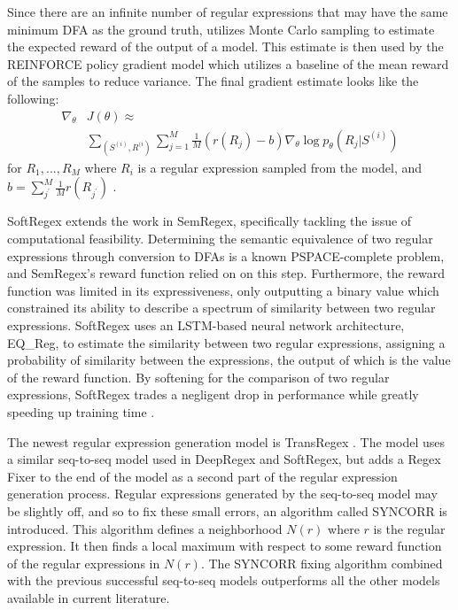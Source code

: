 \documentclass[11pt,a4paper]{article}
\begin{document}
Since there are an infinite number of regular expressions that may have the same minimum DFA as the ground truth, \cite{zhong-etal-2018-semregex} utilizes Monte Carlo sampling to estimate the expected reward of the output of a model. This estimate is then used by the REINFORCE policy gradient model \cite{Williams:92} which utilizes a baseline of the mean reward of the samples to reduce variance. The final gradient estimate looks like the following: \begin{align*} \nabla_{\theta} & J(\theta) \approx \\ & \sum_{(S^{(i)}, R^{(i})} \sum_{j=1}^M \frac{1}{M}(r(R_j)-b) \nabla_{\theta}\log p_{\theta}(R_j | S^{(i)}) \end{align*}
for $R_1, ..., R_M$ where $R_i$ is a regular expression sampled from the model, and $b = \sum_{j^{\prime}}^M \frac{1}{M}r(R_{j^{\prime}})$ \cite{zhong-etal-2018-semregex}.

SoftRegex \cite{park-etal-2019-softregex} extends the work in SemRegex, specifically tackling the issue of computational feasibility. Determining the semantic equivalence of two regular expressions through conversion to DFAs is a known PSPACE-complete problem, and SemRegex's reward function relied on on this step. Furthermore, the reward function was limited in its expressiveness, only outputting a binary value which constrained its ability to describe a spectrum of similarity between two regular expressions. SoftRegex uses an LSTM-based neural network architecture, EQ\_Reg, to estimate the similarity between two regular expressions, assigning a probability of similarity between the expressions, the output of which is the value of the reward function. By softening for the comparison of two regular expressions, SoftRegex trades a negligent drop in performance while greatly speeding up training time \cite{park-etal-2019-softregex}. 

The newest regular expression generation model is TransRegex \cite{Li:2021}. The model uses a similar seq-to-seq model used in DeepRegex and SoftRegex, but adds a Regex Fixer to the end of the model as a second part of the regular expression generation process. Regular expressions generated by the seq-to-seq model may be slightly off, and so to fix these small errors, an algorithm called SYNCORR is introduced. This algorithm defines a neighborhood $N(r)$ where $r$ is the regular expression. It then finds a local maximum with respect to some reward function of the regular expressions in $N(r)$. The SYNCORR fixing algorithm combined with the previous successful seq-to-seq models outperforms all the other models available in current literature.
\end{document}
